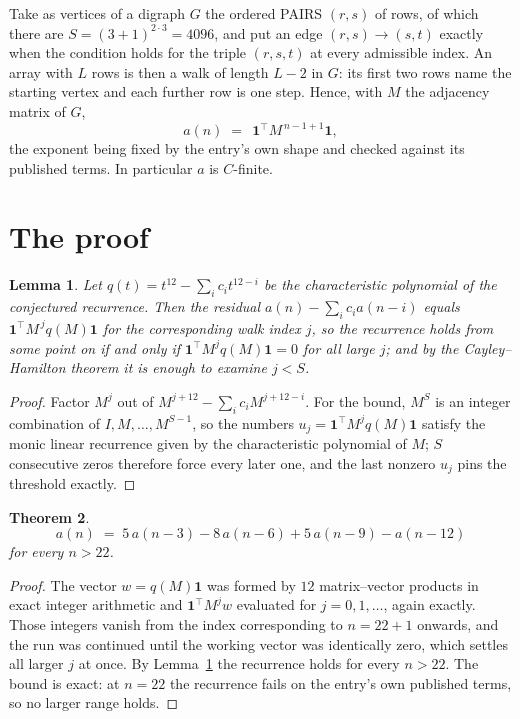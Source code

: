 \documentclass[11pt,a4paper]{article}
\theoremstyle{plain}
\newtheorem{theorem}{Theorem}
\newtheorem{lemma}[theorem]{Lemma}
\theoremstyle{definition}
\begin{document}
Take as vertices of a digraph $G$ the ordered PAIRS $(r,s)$ of rows, of which there are
$S=(3+1)^{2\cdot3}=4096$, and put an edge $(r,s)\to(s,t)$ exactly when the condition
holds for the triple $(r,s,t)$ at every admissible index. An array with $L$ rows is then a
walk of length $L-2$ in $G$: its first two rows name the starting vertex and each further
row is one step. Hence, with $M$ the adjacency matrix of $G$,
\[
a(n)\;=\;\,\mathbf{1}^{\!\top}M^{\,n-1+1}\mathbf{1},
\]
the exponent being fixed by the entry's own shape and checked against its published terms.
In particular $a$ is $C$-finite.

\section{The proof}

\begin{lemma}\label{lem:crit}
Let $q(t)=t^{12}-\sum_i c_it^{12-i}$ be the characteristic polynomial of the
conjectured recurrence. Then the residual $a(n)-\sum_ic_ia(n-i)$ equals
$\mathbf{1}^{\!\top}M^{\,j}q(M)\mathbf{1}$ for the corresponding walk index
$j$, so the recurrence holds from some point on if and only if
$\mathbf{1}^{\!\top}M^{j}q(M)\mathbf{1}=0$ for all large $j$; and by the
Cayley--Hamilton theorem it is enough to examine $j<S$.
\end{lemma}

\begin{proof}
Factor $M^{j}$ out of $M^{j+12}-\sum_ic_iM^{j+12-i}$. For the bound, $M^{S}$
is an integer combination of $I,M,\dots,M^{S-1}$, so the numbers
$u_j=\mathbf{1}^{\!\top}M^{j}q(M)\mathbf{1}$ satisfy the monic linear recurrence given by
the characteristic polynomial of $M$; $S$ consecutive zeros therefore force every later one,
and the last nonzero $u_j$ pins the threshold exactly.
\end{proof}

\begin{theorem}
\[
a(n)\;=\;5\,a(n-3) - 8\,a(n-6) + 5\,a(n-9) - a(n-12)
\]
for every $n>22$.
\end{theorem}

\begin{proof}
The vector $w=q(M)\mathbf{1}$ was formed by $12$ matrix--vector products in exact
integer arithmetic and $\mathbf{1}^{\!\top}M^{j}w$ evaluated for $j=0,1,\dots$, again
exactly. Those integers vanish from the index corresponding to $n=22+1$ onwards, and the
run was continued until the working vector was identically zero, which settles all larger $j$
at once. By Lemma~\ref{lem:crit} the recurrence holds for every $n>22$. The bound is exact: at $n=22$ the recurrence fails on the entry's own published terms, so no larger range holds.
\end{proof}
\end{document}
